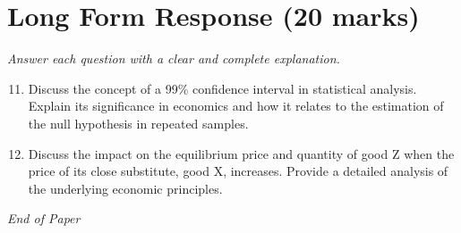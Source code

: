 \documentclass[12pt]{article}
\begin{document}
\section*{Long Form Response (20 marks)}
\textit{Answer each question with a clear and complete explanation.}
\begin{enumerate}[label=\arabic*.]
\setcounter{enumi}{10}
\item Discuss the concept of a 99\% confidence interval in statistical analysis. Explain its significance in economics and how it relates to the estimation of the null hypothesis in repeated samples.
\item Discuss the impact on the equilibrium price and quantity of good Z when the price of its close substitute, good X, increases. Provide a detailed analysis of the underlying economic principles.
\end{enumerate}

\vfill
\noindent\textit{End of Paper}
\end{document}
